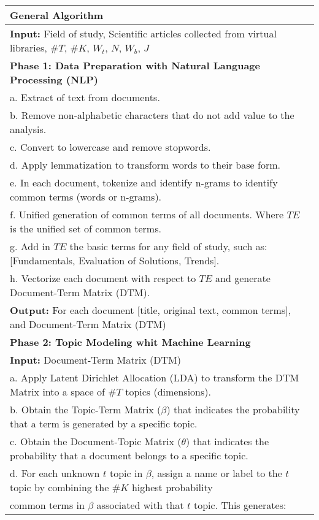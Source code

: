 \documentclass[runningheads]{llncs}
\begin{document}
\begin{figure*}[!h]
	\centering
	\begin{tabular}{l}
		\hline
		\textbf{General Algorithm} \\
		\hline
		\textbf{Input:} Field of study, Scientific articles collected from virtual libraries, $\#T$, $\#K$, $W_{t}$, $N$, $W_b$, $J$\\
		\hline
		\textbf{Phase 1: Data Preparation with Natural Language Processing (NLP)} \\
		\quad a. Extract of text from documents. \\
		\quad b. Remove non-alphabetic characters that do not add value to the analysis. \\
		\quad c. Convert to lowercase and remove stopwords. \\
		\quad d. Apply lemmatization to transform words to their base form. \\
		\quad e. In each document, tokenize and identify n-grams to identify common terms (words or n-grams). \\
		\quad f. Unified generation of common terms of all documents. Where $TE$ is the unified set of common terms.\\
		\quad g. Add in $TE$ the basic terms for any field of study, such as: [Fundamentals, Evaluation of Solutions, Trends]. \\
		\quad h. Vectorize each document with respect to $TE$ and generate Document-Term Matrix (DTM).\\
		\quad \textbf{Output:} For each document [title, original text, common terms], and Document-Term Matrix (DTM)\\
		\textbf{Phase 2: Topic Modeling whit Machine Learning} \\
		\quad \textbf{Input:} Document-Term Matrix (DTM) \\
		\quad a. Apply Latent Dirichlet Allocation (LDA) to transform the DTM Matrix into a space of $\#T$ topics (dimensions).\\
		\quad b. Obtain the Topic-Term Matrix ($\beta$) that indicates the probability that a term is generated by a specific topic.\\ 
		\quad c. Obtain the Document-Topic Matrix ($\theta$) that indicates the probability that a document belongs to a specific topic.\\
		\quad d. For each unknown $t$ topic in $\beta$, assign a name or label to the $t$ topic by combining the $\#K$ highest probability\\
		\quad \quad common terms in $\beta$ associated with that $t$ topic. This generates: \\

\end{tabular}
\end{figure*}
\end{document}
